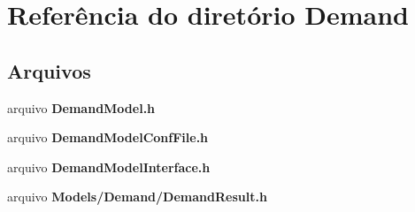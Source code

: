 \section{Referência do diretório Demand}
\label{dir_d9e9931163c49bf86bfe8bb935b7c961}
\subsection*{Arquivos}
\begin{DoxyCompactItemize}
\item 
arquivo {\bf Demand\+Model.\+h}
\item 
arquivo {\bf Demand\+Model\+Conf\+File.\+h}
\item 
arquivo {\bf Demand\+Model\+Interface.\+h}
\item 
arquivo {\bf Models/\+Demand/\+Demand\+Result.\+h}
\end{DoxyCompactItemize}
